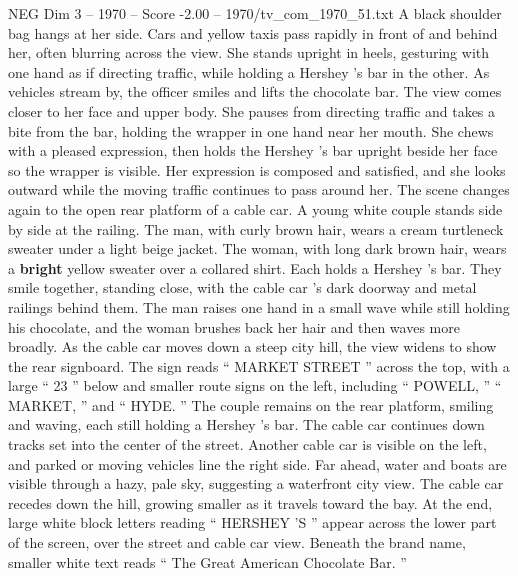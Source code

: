\begin{textsample}{NEG Dim 3 – 1970 – Score -2.00 – 1970/tv\_com\_1970\_51.txt}
A black shoulder bag hangs at her side.
Cars and yellow taxis pass rapidly in front of and behind her, often blurring across the view.
She stands upright in heels, gesturing with one hand as if directing traffic, while holding a Hershey ’s bar in the other.
As vehicles stream by, the officer smiles and lifts the chocolate bar.
The view comes closer to her face and upper body.
She pauses from directing traffic and takes a bite from the bar, holding the wrapper in one hand near her mouth.
She chews with a pleased expression, then holds the Hershey ’s bar upright beside her face so the wrapper is visible.
Her expression is composed and satisfied, and she looks outward while the moving traffic continues to pass around her.
The scene changes again to the open rear platform of a cable car.
A young white couple stands side by side at the railing.
The man, with curly brown hair, wears a cream turtleneck sweater under a light beige jacket.
The woman, with long dark brown hair, wears a \textbf{bright} yellow sweater over a collared shirt.
Each holds a Hershey ’s bar.
They smile together, standing close, with the cable car ’s dark doorway and metal railings behind them.
The man raises one hand in a small wave while still holding his chocolate, and the woman brushes back her hair and then waves more broadly.
As the cable car moves down a steep city hill, the view widens to show the rear signboard.
The sign reads “ MARKET STREET ” across the top, with a large “ 23 ” below and smaller route signs on the left, including “ POWELL, ” “ MARKET, ” and “ HYDE. ” The couple remains on the rear platform, smiling and waving, each still holding a Hershey ’s bar.
The cable car continues down tracks set into the center of the street.
Another cable car is visible on the left, and parked or moving vehicles line the right side.
Far ahead, water and boats are visible through a hazy, pale sky, suggesting a waterfront city view.
The cable car recedes down the hill, growing smaller as it travels toward the bay.
At the end, large white block letters reading “ HERSHEY ’S ” appear across the lower part of the screen, over the street and cable car view.
Beneath the brand name, smaller white text reads “ The Great American Chocolate Bar. ”

\end{textsample}
